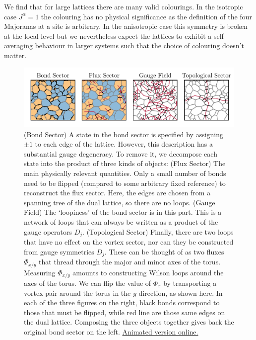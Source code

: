 We find that for large lattices there are many valid colourings. In the isotropic case \(J^\alpha = 1\) the colouring has no physical significance as the definition of the four Majoranas at a site is arbitrary. In the anisotropic case this symmetry is broken at the local level but we nevertheless expect the lattices to exhibit a self averaging behaviour in larger systems such that the choice of colouring doesn't matter.

\hypertarget{fig:state_decomposition_animated}{%
\begin{figure}
\centering
\includegraphics[width=1\textwidth,height=\textheight]{figure_code/amk_chapter/intro/state_decomposition_animated/state_decomposition_animated}
\caption[{State Decomposition}]{(Bond Sector) A state in the bond sector is specified by assigning \(\pm 1\) to each edge of the lattice. However, this description has a substantial gauge degeneracy. To remove it, we decompose each state into the product of three kinds of objects: (Flux Sector) The main physically relevant quantities. Only a small number of bonds need to be flipped (compared to some arbitrary fixed reference) to reconstruct the flux sector. Here, the edges are chosen from a spanning tree of the dual lattice, so there are no loops. (Gauge Field) The `loopiness' of the bond sector is in this part. This is a network of loops that can always be written as a product of the gauge operators \(D_j\). (Topological Sector) Finally, there are two loops that have no effect on the vortex sector, nor can they be constructed from gauge symmetries \(D_j\). These can be thought of as two fluxes \(\Phi_{x/y}\) that thread through the major and minor axes of the torus. Measuring \(\Phi_{x/y}\) amounts to constructing Wilson loops around the axes of the torus. We can flip the value of \(\Phi_{x}\) by transporting a vortex pair around the torus in the \(y\) direction, as shown here. In each of the three figures on the right, black bonds correspond to those that must be flipped, while red line are those same edges on the dual lattice. Composing the three objects together gives back the original bond sector on the left. \href{http://thomashodson.com/assets/thesis/amk_chapter/intro/state_decomposition_animated/state_decomposition_animated.gif}{ Animated version online.}}
\label{fig:state_decomposition_animated}
\end{figure}
}

